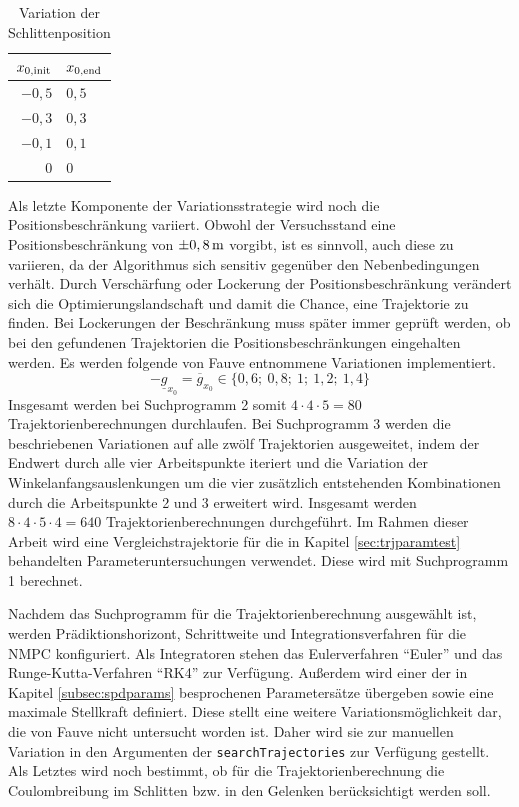 \begin{table}[h]
	\centering
	\caption{Variation der Schlittenposition}
		\begin{tabular}{r|l}
			$x_{0\mathrm{,init}}$ & $x_{0\mathrm{,end}}$ \\
			\midrule
			$-0,5$ & $0,5$	\\	
			$-0,3$ & $0,3$	\\	
			$-0,1$ & $0,1$	\\	
			   $0$ &   $0$	\\
			
		\end{tabular}
	\label{tab:varpos}
\end{table}

Als letzte Komponente der Variationsstrategie wird noch die Positionsbeschränkung variiert. Obwohl der Versuchsstand eine Positionsbeschränkung von $\pm0,8\,\mathrm{m}$ vorgibt, ist es sinnvoll, auch diese zu variieren, da der Algorithmus sich sensitiv gegenüber den Nebenbedingungen verhält. Durch Verschärfung oder Lockerung der Positionsbeschränkung verändert sich die Optimierungslandschaft und damit die Chance, eine Trajektorie zu finden. Bei Lockerungen der Beschränkung muss später immer geprüft werden, ob bei den gefundenen Trajektorien die Positionsbeschränkungen eingehalten werden. Es werden folgende von Fauve \cite{fauve} entnommene Variationen implementiert.
	\[
	-\underline{g}_{x_0} = \overline{g}_{x_0} \in \{ 0,6; \ 0,8; \ 1; \ 1,2; \ 1,4 \}  
\]
Insgesamt werden bei Suchprogramm 2 somit $4 \cdot 4 \cdot 5 = 80$ Trajektorienberechnungen durchlaufen. Bei Suchprogramm 3 werden die beschriebenen Variationen auf alle zwölf Trajektorien ausgeweitet, indem der Endwert durch alle vier Arbeitspunkte iteriert und die Variation der Winkelanfangsauslenkungen um die vier zusätzlich entstehenden Kombinationen durch die Arbeitspunkte 2 und 3 erweitert wird. Insgesamt werden $8 \cdot 4 \cdot 5 \cdot 4 = 640$ Trajektorienberechnungen durchgeführt.
Im Rahmen dieser Arbeit wird eine Vergleichstrajektorie für die in Kapitel \ref{sec:trjparamtest} behandelten Parameteruntersuchungen verwendet. Diese wird mit Suchprogramm 1 berechnet.

Nachdem das Suchprogramm für die Trajektorienberechnung ausgewählt ist, werden Prädiktionshorizont, Schrittweite und Integrationsverfahren für die NMPC konfiguriert. Als Integratoren stehen das Eulerverfahren "`Euler"' und das Runge-Kutta-Verfahren "`RK4"' zur Verfügung. Außerdem wird einer der in Kapitel \ref{subsec:spdparams} besprochenen Parametersätze übergeben sowie eine maximale Stellkraft definiert. Diese stellt eine weitere Variationsmöglichkeit dar, die von Fauve \cite{fauve} nicht untersucht worden ist. Daher wird sie zur manuellen Variation in den Argumenten der \texttt{searchTrajectories} zur Verfügung gestellt.
Als Letztes wird noch bestimmt, ob für die Trajektorienberechnung die Coulombreibung im Schlitten bzw. in den Gelenken berücksichtigt werden soll. 

